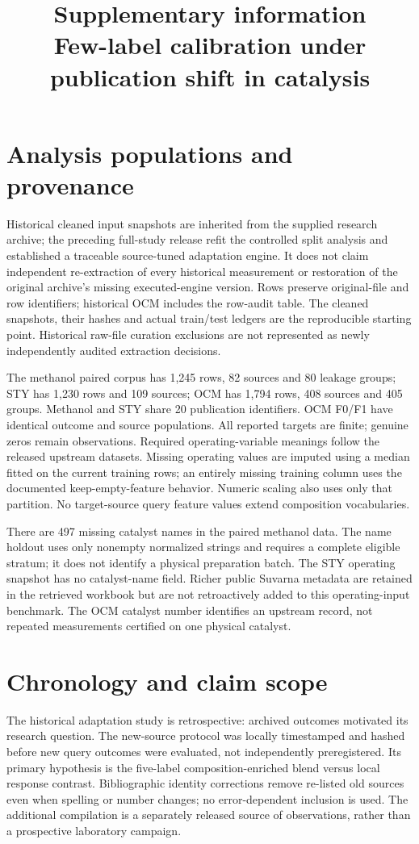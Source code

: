 \documentclass[11pt]{article}
\title{Supplementary information\\Few-label calibration under publication shift in catalysis}
\author{}\date{}
\begin{document}
\maketitle
\section{Analysis populations and provenance}
Historical cleaned input snapshots are inherited from the supplied research archive; the preceding full-study release refit the controlled split analysis and established a traceable source-tuned adaptation engine. It does not claim independent re-extraction of every historical measurement or restoration of the original archive's missing executed-engine version. Rows preserve original-file and row identifiers; historical OCM includes the row-audit table. The cleaned snapshots, their hashes and actual train/test ledgers are the reproducible starting point. Historical raw-file curation exclusions are not represented as newly independently audited extraction decisions.

The methanol paired corpus has 1,245 rows, 82 sources and 80 leakage groups; STY has 1,230 rows and 109 sources; OCM has 1,794 rows, 408 sources and 405 groups. Methanol and STY share 20 publication identifiers. OCM F0/F1 have identical outcome and source populations. All reported targets are finite; genuine zeros remain observations. Required operating-variable meanings follow the released upstream datasets. Missing operating values are imputed using a median fitted on the current training rows; an entirely missing training column uses the documented keep-empty-feature behavior. Numeric scaling also uses only that partition. No target-source query feature values extend composition vocabularies.

There are 497 missing catalyst names in the paired methanol data. The name holdout uses only nonempty normalized strings and requires a complete eligible stratum; it does not identify a physical preparation batch. The STY operating snapshot has no catalyst-name field. Richer public Suvarna metadata are retained in the retrieved workbook but are not retroactively added to this operating-input benchmark. The OCM catalyst number identifies an upstream record, not repeated measurements certified on one physical catalyst.

\section{Chronology and claim scope}
The historical adaptation study is retrospective: archived outcomes motivated its research question. The new-source protocol was locally timestamped and hashed before new query outcomes were evaluated, not independently preregistered. Its primary hypothesis is the five-label composition-enriched blend versus local response contrast. Bibliographic identity corrections remove re-listed old sources even when spelling or number changes; no error-dependent inclusion is used. The additional compilation is a separately released source of observations, rather than a prospective laboratory campaign.
\end{document}
